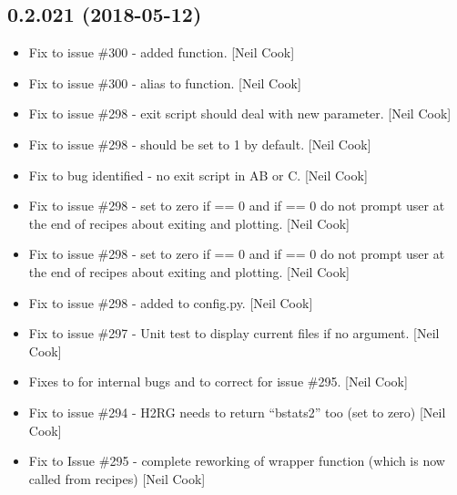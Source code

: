 \documentclass[a4paper,10pt,english]{report}
\begin{document}
\subsection{0.2.021 (2018-05-12)}
\label{\detokenize{misc/changelog:id440}}\begin{itemize}
\item {} 
Fix to issue \#300 - added  function. {[}Neil Cook{]}

\item {} 
Fix to issue \#300 - alias to  function. {[}Neil Cook{]}

\item {} 
Fix to issue \#298 - exit script should deal with new 
parameter. {[}Neil Cook{]}

\item {} 
Fix to issue \#298 -  should be set to 1 by default.
{[}Neil Cook{]}

\item {} 
Fix to bug identified - no exit script in AB or C. {[}Neil Cook{]}

\item {} 
Fix to issue \#298 - set  to zero if  == 0 and
if  == 0 do not prompt user at the end of recipes about
exiting and plotting. {[}Neil Cook{]}

\item {} 
Fix to issue \#298 - set  to zero if  == 0 and
if  == 0 do not prompt user at the end of recipes about
exiting and plotting. {[}Neil Cook{]}

\item {} 
Fix to issue \#298 - added  to config.py. {[}Neil Cook{]}

\item {} 
Fix to issue \#297 - Unit test to display current files if no argument.
{[}Neil Cook{]}

\item {} 
Fixes to  for internal bugs and to correct for issue \#295.
{[}Neil Cook{]}

\item {} 
Fix to issue \#294 - H2RG needs to return “bstats2” too (set to zero)
{[}Neil Cook{]}

\item {} 
Fix to Issue \#295 - complete reworking of wrapper function (which is
now called from recipes) {[}Neil Cook{]}


\end{itemize}
\end{document}
